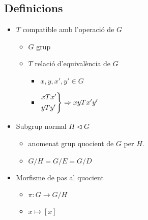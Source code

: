 \documentclass{article}
\begin{document}
\subsection*{Definicions}
\begin{itemize}
\item $T$ compatible amb l'operació de $G$
	\begin{itemize}
	\item $G$ grup
	\item $T$ relació d'equivalència de $G$
		\begin{itemize}
		\item $x, y, x', y' \in G$
		\item 	$
			\begin{rcases}
			xTx'\\yTy'
			\end{rcases}
			\Rightarrow xyTx'y'
			$
		\end{itemize}
	\end{itemize}
\item Subgrup normal $H \triangleleft G$
	\begin{itemize}
	\item anomenat grup quocient de $G$ per $H$.
	\item $G/H = G/E = G/D$
	\end{itemize}
\item Morfisme de pas al quocient
	\begin{itemize}
	\item $\pi:G \to G/H$
	\item $x \mapsto [x]$
	\end{itemize}
\end{itemize}
\end{document}
